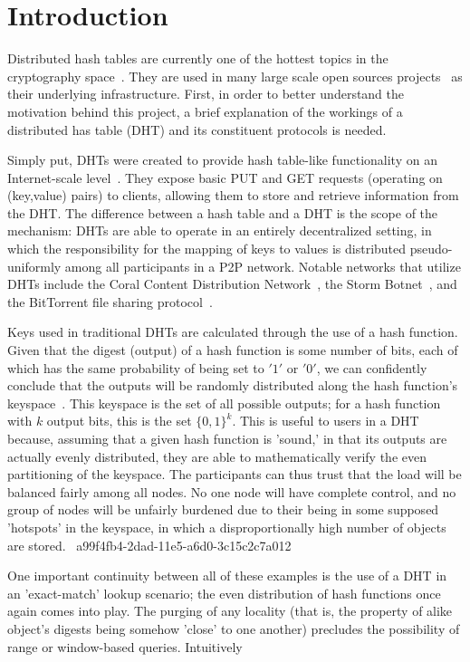 \documentclass[12pt]{article}
\begin{document}
\section{Introduction}
\par Distributed hash tables are currently one of the hottest topics in the cryptography space~\cite{Stoica:2001dj,Rowstron:2001ea,Ratnasamy:2001wn}. They are used in many large scale open sources projects~\cite{Freitas:2013tb,Xu:2010vs,Perfitt:2010fh} as their underlying infrastructure. First, in order to better understand the motivation behind this project, a brief explanation of the workings of a distributed has table (DHT) and its constituent protocols is needed.

\par Simply put, DHTs were created to provide hash table-like functionality on an Internet-scale level~\cite{Ratnasamy:2001wn}. They expose basic PUT and GET requests (operating on (key,value) pairs) to clients, allowing them to store and retrieve information from the DHT. The difference between a hash table and a DHT is the scope of the mechanism: DHTs are able to operate in an entirely decentralized setting, in which the responsibility for the mapping of keys to values is distributed pseudo-uniformly among all participants in a P2P network. Notable networks that utilize DHTs include the Coral Content Distribution Network~\cite{Freedman:2004vb}, the Storm Botnet~\cite{Holz:2008uk}, and the BitTorrent file sharing protocol~\cite{Cohen:y1_8mBnw}.

\par Keys used in traditional DHTs are calculated through the use of a hash function. Given that the digest (output) of a hash function is some number of bits, each of which has the same probability of being set to $'1'$ or $'0'$, we can confidently conclude that the outputs will be randomly distributed along the hash function's keyspace~. This keyspace is the set of all possible outputs; for a hash function with $k$ output bits, this is the set $\{0,1\}^k$. This is useful to users in a DHT because, assuming that a given hash function is 'sound,' in that its outputs are actually evenly distributed, they are able to mathematically verify the even partitioning of the keyspace. The participants can thus trust that the load will be balanced fairly among all nodes. No one node will have complete control, and no group of nodes will be unfairly burdened due to their being in some supposed 'hotspots' in the keyspace, in which a disproportionally high number of objects are stored.~
a99f4fb4-2dad-11e5-a6d0-3c15c2c7a012
\par One important continuity between all of these examples is the use of a DHT in an 'exact-match' lookup scenario; the even distribution of hash functions once again comes into play. The purging of any locality (that is, the property of alike object's digests being somehow 'close' to one another) precludes the possibility of range or window-based queries. Intuitively
\end{document}
